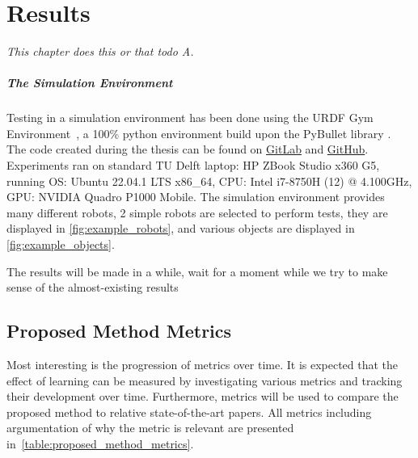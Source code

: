 \chapter{Results}%
\label{chap:results}
\textit{This chapter does this or that todo A.\bs}

\paragraph{The Simulation Environment}
Testing in a simulation environment has been done using the URDF Gym Environment~\cite{spahn_urdfenvironment_2022}, a 100\% python environment build upon the PyBullet library \cite{coumans_pybullet_2016}. The code created during the thesis can be found on \href{https://gitlab.tudelft.nl/airlab-delft/msc_projects/msc_gijs_groote}{GitLab} and \href{https://github.com/GijsGroote/semantic-thinking-robot}{GitHub}. Experiments ran on standard TU Delft laptop: HP ZBook Studio x360 G5, running OS: Ubuntu 22.04.1 LTS x86\_64, CPU: Intel i7-8750H (12) @ 4.100GHz, GPU: NVIDIA Quadro P1000 Mobile.\bs
The simulation environment provides many different robots, 2 simple robots are selected to perform tests, they are displayed in \cref{fig:example_robots}, and various objects are displayed in \cref{fig:example_objects}.


The results will be made in a while, wait for a moment while we try to make sense of the almost-existing results


\section{Proposed Method Metrics}%
\label{sec:proposed_method_metrics}
Most interesting is the progression of metrics over time. It is expected that the effect of learning can be measured by investigating various metrics and tracking their development over time. Furthermore, metrics will be used to compare the proposed method to relative state-of-the-art papers. All metrics including argumentation of why the metric is relevant are presented in~\cref{table:proposed_method_metrics}.\bs

